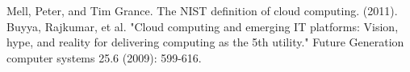 \documentclass[12pt,a4paper]{article}
\begin{document}
\begin{thebibliography}{99}
 {\lat Mell, Peter, and Tim Grance. The NIST definition of cloud computing. (2011).}
 {\lat Buyya, Rajkumar, et al. "Cloud computing and emerging IT platforms: Vision, hype, and reality for delivering computing as the 5th utility." Future Generation computer systems 25.6 (2009): 599-616.}
\end{thebibliography}


\newpage
\tableofcontents
\thispagestyle{empty}
\end{document}
